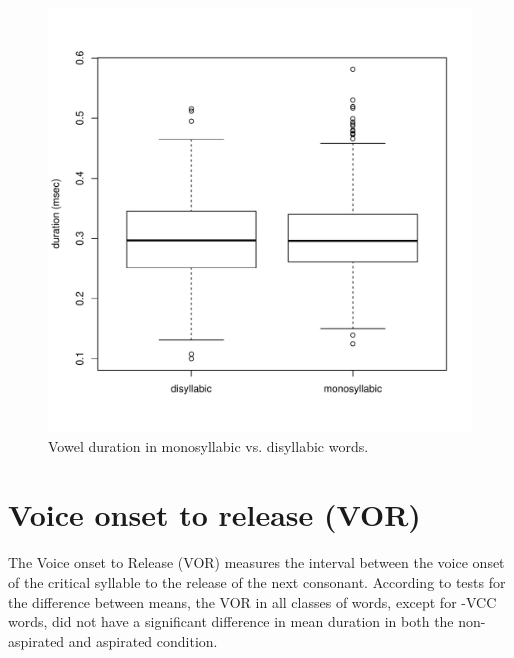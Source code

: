 \documentclass[11pt,a4paper,openany]{memoir}\usepackage[]{graphicx}\usepackage[]{color}
\newenvironment{knitrout}{}{} %
\begin{document}
\begin{figure}
\centering
\begin{knitrout}
\color{fgcolor}
\includegraphics[width=\textwidth]{img/voic-syll-box-1} 

\end{knitrout}
\caption{Vowel duration in monosyllabic vs. disyllabic words.}
\label{f:vvpsyll}
\end{figure}

\section{Voice onset to release (VOR)}



The Voice onset to Release (VOR) measures the interval between the voice onset of the critical syllable to the release of the next consonant.
According to tests for the difference between means, the VOR in all classes of words, except for -VCC words, did not have a significant difference in mean duration in both the non-aspirated and aspirated condition.

\end{document}
